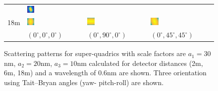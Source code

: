 \begin{figure}[thb]
{\begin{tabular}{llll}
     & \includegraphics[width=0.13\textwidth]{../images/form_factor/supershapes/superquadrics_2_5_0_45_45_6m.png}  \\
18m  & \includegraphics[width=0.13\textwidth]{../images/form_factor/supershapes/superquadrics_2_5_0_0_0_18m.png}
     & \includegraphics[width=0.13\textwidth]{../images/form_factor/supershapes/superquadrics_2_5_0_90_0_18m.png}
     & \includegraphics[width=0.13\textwidth]{../images/form_factor/supershapes/superquadrics_2_5_0_45_45_18m.png}  \\
     & {\small $(0^\circ,0^\circ,0^\circ)$}
     & {\small $(0^\circ,90^\circ,0^\circ)$}
     & {\small $(0^\circ,45^\circ,45^\circ)$}  %
\end{tabular}
}
\endgroup
  \caption{Scattering patterns for super-quadrics with scale factors are $a_1=30$nm, $a_2=20$nm, $a_3=10$nm calculated for detector distances (2m, 6m, 18m) and a wavelength of 0.6nm are shown. Three orientation using Tait–Bryan angles (yaw-
pitch-roll) are shown.} \label{fig:superquadricsIQ2D}
\end{figure}

